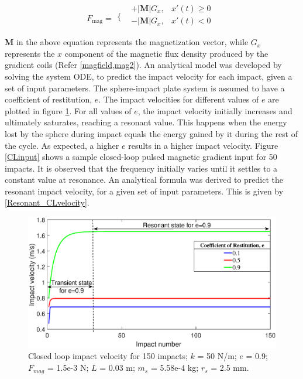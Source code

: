 \documentclass[letterpaper, 10 pt, conference]{ieeeconf}  %
\begin{document}
\begin{equation}
F_{\text{mag}}=
\begin{array}{cc}
\{ & 
\begin{array}{cc}
+\left|\mathbf{M}\right|  G_x, &x' (t)\geq 0 \\
-\left|\mathbf{M}\right|  G_x, &x' (t)<0 \\
\end{array}
\\
\end{array}
\label{Closed_loop_gradient}
\end{equation}
\linebreak
\textbf{M} in the above equation represents the magnetization vector, while $G_x$ represents the $x$ component of the magnetic flux density produced by the gradient coils (Refer \cref{magfield,mag2}). An analytical model was developed by solving the system ODE, to predict the impact velocity for each impact, given a set of input parameters. The sphere-impact plate system is assumed to have a coefficient of restitution, $e$. The impact velocities for different values of $e$ are plotted in figure \ref{Closedloop_Impact_velocity}.
For all values of $e$, the impact velocity initially increases and ultimately saturates, reaching a resonant value. This happens when the energy lost by the sphere during impact equals the energy gained by it during the rest of the cycle. As expected, a higher $e$ results in a higher impact velocity. Figure \ref{CLinput} shows a sample closed-loop pulsed magnetic gradient input for 50 impacts. It is observed that the frequency initially varies until it settles to a constant value at resonance. An analytical formula was derived to predict the resonant impact velocity, for a given set of input parameters. This is given by \cref{Resonant_CLvelocity}.

\begin{figure}
	\includegraphics[width=\linewidth]{Closedloop_Impact_velocity.eps}
	\caption{Closed loop impact velocity for 150 impacts; $k$ = 50 N/m; $e$ = 0.9; $F_{mag}$ = 1.5e-3 N; $L$ = 0.03 m; $m_s$ = 5.58e-4 kg; $r_s$ = 2.5 mm.}
	\label{Closedloop_Impact_velocity}
	
\end{figure}
\end{document}

